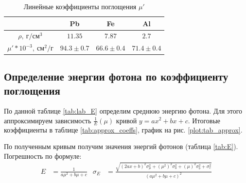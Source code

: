 \documentclass[a4paper, 12pt]{article}
\begin{document}
            \begin{table}[!ht]
                \centering
                \begin{tabular}{|c|c|c|c|}
                    \hline
                     & Pb & Fe & Al\\ \hline
                    $\rho,~г/см^3$ & $11.35$ & $7.87$ & $2.7$\\ \hline
                    $\mu'*10^{-3},~см^2/г$ & $94.3 \pm 0.7$ & $66.6 \pm 0.4$ & $71.4 \pm 0.4$\\ \hline
                 \end{tabular}
                \caption{Линейные коэффициенты поглощения $\mu'$}
                \label{tab:mu_m1}
            \end{table}

        \subsection{Определение энергии фотона по коэффициенту поглощения}

            По данной таблице \ref{tab:lab_E} определим среднюю энергию фотона. Для этого аппроксимируем зависимость $\frac{1}{E}(\mu)$ кривой $y = ax^2 + bx + c$. Итоговые коэффициенты в таблице \ref{tab:approx_coeffs}, график на рис. \ref{plot:tab_approx}.

            По полученным кривым получим значения энергий фотонов (таблица \ref{tab:E}). Погрешность по формуле:
            \begin{align*}
                E &= \frac{1}{a\mu^2 + b\mu + c} & \sigma_E &= \frac{\sqrt{\left( 2ax + b \right)^2 \sigma_{\mu}^2 + \left( \mu^2 \right)^2 \sigma_a^2 + \left( \mu \right)^2 \sigma_b^2 + \sigma_c^2}}{\left( a\mu^2 + b\mu + c \right)^2}
            \end{align*}
\end{document}
